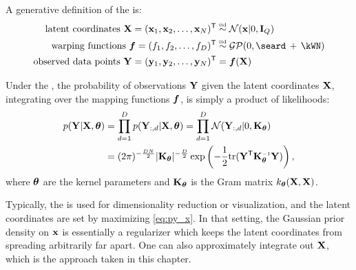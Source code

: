 A generative definition of the \gplvm{} is:
%
\begin{align}
\textnormal{latent coordinates } \vX = (\vx_1, \vx_2, \ldots, \vx_{N})\tra & \simiid \N{\vx}{0}{\vI_Q} \\
\textnormal{warping functions } \vf = (f_1, f_2, \ldots, f_D)\tra & \simiid \GPt{0}{\seard \kernplus \kWN} \\
\textnormal{observed data points } \vY = (\vy_1, \vy_2, \ldots, \vy_N)\tra & = \vf(\vX)
\end{align}

Under the \gplvm{}, the probability of observations $\mathbf{Y}$ given the latent coordinates $\mathbf{X}$, integrating over the mapping functions $\boldsymbol{f}$, is simply a product of \gp{} likelihoods:
\begin{align}
p(\vY | \vX, \vtheta) 
& = \prod_{d=1}^D p(\vY_{:,d} | \vX, \vtheta) 
  = \prod_{d=1}^D \N{\vY_{:,d}}{0}{\vK_\vtheta} \\ 
& = (2 \pi)^{-\frac{DN}{2}}  |\vK_\vtheta|^{-\frac{D}{2}} \exp \left( -\frac{1}{2} {\rm tr}( \vY\tra \vK_\vtheta\inv \vY) \right),
\label{eq:py_x}
\end{align}
%
where ${\boldsymbol{\theta}}$ are the kernel parameters and $\mathbf{K}_{\boldsymbol{\theta}}$ is the Gram matrix $k_{\boldsymbol{\theta}}(\mathbf{X}, \mathbf{X})$.

Typically, the \gplvm{} is used for dimensionality reduction or visualization, and the latent coordinates are set by maximizing \eqref{eq:py_x}.
In that setting, the Gaussian prior density on ${\bf{x}}$ is essentially a regularizer which keeps the latent coordinates from spreading arbitrarily far apart.  
One can also approximately integrate out $\mathbf{X}$, which is the approach taken in this chapter.





